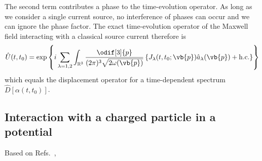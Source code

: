 The second term contributes a phase to the time-evolution operator.
As long as we consider a single current source, no interference of phases can occur and we can ignore the phase factor.
The exact time-evolution operator of the Maxwell field interacting with a classical source current therefore is
\begin{equation}
	\hat{U}(t,t_0)
	=
	\exp\left\{
		i\sum_{\lambda=1,2}
		\int_{\mathbb{R}^3}\frac{\odif[3]{p}}{(2\pi)^3\sqrt{2\omega(\vb{p})}}
		\left\{
			J_\lambda(t,t_0;\vb{p})
			\hat{a}_\lambda(\vb{p})
			+
			\text{h.c.}
		\right\}
	\right\}
\end{equation}
which equals the displacement operator for a time-dependent spectrum $\hat{D}[\alpha(t,t_0)]$.

\subsection{Interaction with a charged particle in a potential}

Based on Refs.~\cite[p.~687]{Mandel1995},~\cite[p.~128]{Cohen1992}

